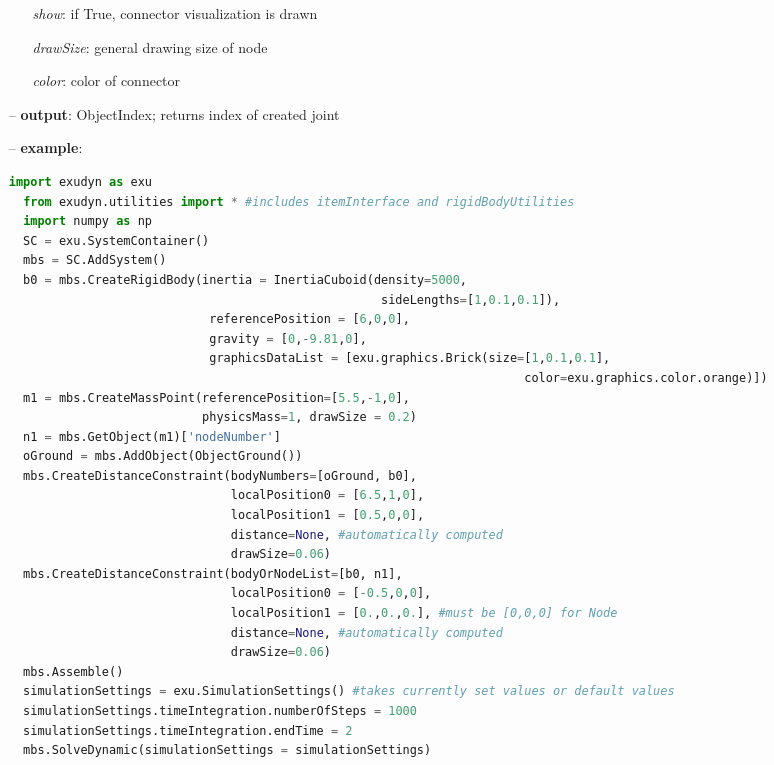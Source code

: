 \begin{itemize}[leftmargin=0.7cm]
\begin{itemize}[leftmargin=1.2cm]
\item[]{\it show}: if True, connector visualization is drawn
\item[]{\it drawSize}: general drawing size of node
\item[]{\it color}: color of connector
\end{itemize}
\item[--]
{\bf output}: ObjectIndex; returns index of created joint
\item[--]
{\bf example}: \vspace{-12pt}\ei\begin{lstlisting}[language=Python, xleftmargin=36pt]
  import exudyn as exu
  from exudyn.utilities import * #includes itemInterface and rigidBodyUtilities
  import numpy as np
  SC = exu.SystemContainer()
  mbs = SC.AddSystem()
  b0 = mbs.CreateRigidBody(inertia = InertiaCuboid(density=5000,
                                                    sideLengths=[1,0.1,0.1]),
                            referencePosition = [6,0,0],
                            gravity = [0,-9.81,0],
                            graphicsDataList = [exu.graphics.Brick(size=[1,0.1,0.1],
                                                                        color=exu.graphics.color.orange)])
  m1 = mbs.CreateMassPoint(referencePosition=[5.5,-1,0],
                           physicsMass=1, drawSize = 0.2)
  n1 = mbs.GetObject(m1)['nodeNumber']
  oGround = mbs.AddObject(ObjectGround())
  mbs.CreateDistanceConstraint(bodyNumbers=[oGround, b0],
                               localPosition0 = [6.5,1,0],
                               localPosition1 = [0.5,0,0],
                               distance=None, #automatically computed
                               drawSize=0.06)
  mbs.CreateDistanceConstraint(bodyOrNodeList=[b0, n1],
                               localPosition0 = [-0.5,0,0],
                               localPosition1 = [0.,0.,0.], #must be [0,0,0] for Node
                               distance=None, #automatically computed
                               drawSize=0.06)
  mbs.Assemble()
  simulationSettings = exu.SimulationSettings() #takes currently set values or default values
  simulationSettings.timeIntegration.numberOfSteps = 1000
  simulationSettings.timeIntegration.endTime = 2
  mbs.SolveDynamic(simulationSettings = simulationSettings)
\end{lstlisting}\vspace{-24pt}\bi\item[]\vspace{-24pt}\vspace{12pt}\end{itemize}
%

